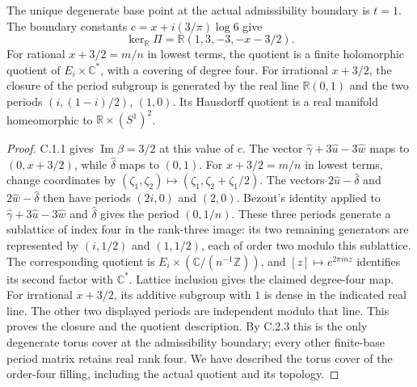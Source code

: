 \begin{proposition}[C.3.2; Proved]\label{st:C.3.2}
The unique degenerate base point at the actual admissibility boundary is
\(t=1\). The boundary constants
\(c=x+i(3/\pi)\log6\) give
\[
 \ker_{\mathbb R}\Pi=\mathbb R(1,3,-3,-x-3/2).
\]
For rational $x+3/2=m/n$ in lowest terms, the quotient is a
finite holomorphic quotient of $E_i\times\mathbb C^*$, with a covering
of degree four. For irrational \(x+3/2\), the closure of the period subgroup is generated
by the real line \(\mathbb R(0,1)\) and the two periods
\((i,(1-i)/2)\), \((1,0)\). Its Hausdorff quotient is a real manifold
homeomorphic to \(\mathbb R\times(S^1)^2\).
\end{proposition}
\begin{proof}
C.1.1 gives \(\operatorname{Im}\beta=3/2\) at this value of \(c\).
The vector \(\widehat\gamma+3\widehat u-3\widehat w\) maps to
\((0,x+3/2)\), while \(\widehat\delta\) maps to \((0,1)\).
For $x+3/2=m/n$ in lowest terms, change coordinates by
$(\zeta_1,\zeta_2)\mapsto(\zeta_1,\zeta_2+\zeta_1/2)$.
The vectors $2\widehat u-\widehat\delta$ and
$2\widehat w-\widehat\delta$ then have periods $(2i,0)$ and $(2,0)$.
Bezout's identity applied to $\widehat\gamma+3\widehat u-3\widehat w$
and $\widehat\delta$ gives the period $(0,1/n)$.
These three periods generate a sublattice of index four in the rank-three
image: its two remaining generators are represented by
$(i,1/2)$ and $(1,1/2)$, each of order two modulo this sublattice.
The corresponding quotient is $E_i\times(\mathbb C/(n^{-1}\mathbb Z))$,
and $[z]\mapsto e^{2\pi inz}$ identifies its second factor with
$\mathbb C^*$. Lattice inclusion gives the claimed degree-four map.
For irrational $x+3/2$, its additive subgroup with $1$ is dense in the
indicated real line. The other two displayed periods are independent
modulo that line. This proves the closure and the quotient description.
By C.2.3 this is the only degenerate torus cover at the admissibility
boundary; every other finite-base period matrix retains real rank four.
We have described the torus cover of the order-four filling, including
the actual quotient and its topology.
\end{proof}

